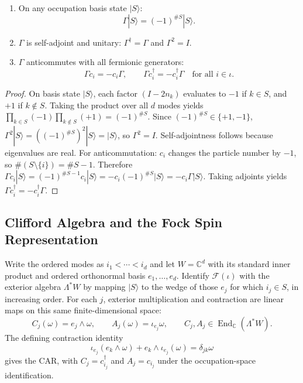 \begin{theorem}
\label{thm:parity_properties}
\begin{enumerate}
    \item On any occupation basis state $|S\rangle$:
    \begin{equation}
    \Gamma |S\rangle = (-1)^{\#S} |S\rangle.
    \end{equation}
    \item $\Gamma$ is self-adjoint and unitary: $\Gamma^\dagger = \Gamma$ and $\Gamma^2 = I$.
    \item $\Gamma$ anticommutes with all fermionic generators:
    \begin{equation}
    \Gamma c_i = - c_i \Gamma, \qquad \Gamma c_i^\dagger = - c_i^\dagger \Gamma \quad \text{for all } i \in \iota.
    \end{equation}
\end{enumerate}
\end{theorem}

\begin{proof}
On basis state $|S\rangle$, each factor $(I - 2 n_k)$ evaluates to $-1$ if $k \in S$, and $+1$ if $k \notin S$. Taking the product over all $d$ modes yields $\prod_{k \in S} (-1) \prod_{k \notin S} (+1) = (-1)^{\#S}$.
Since $(-1)^{\#S} \in \{+1, -1\}$, $\Gamma^2 |S\rangle = ((-1)^{\#S})^2 |S\rangle = |S\rangle$, so $\Gamma^2 = I$. Self-adjointness follows because eigenvalues are real.
For anticommutation: $c_i$ changes the particle number by $-1$, so $\#(S \setminus \{i\}) = \#S - 1$.
Therefore $\Gamma c_i |S\rangle = (-1)^{\#S - 1} c_i |S\rangle = - c_i (-1)^{\#S} |S\rangle = - c_i \Gamma |S\rangle$.
Taking adjoints yields $\Gamma c_i^\dagger = - c_i^\dagger \Gamma$.
\end{proof}

\subsection{Clifford Algebra and the Fock Spin Representation}

Write the ordered modes as $i_1<\cdots<i_d$ and let $W=\mathbb C^d$ with its standard inner product and ordered orthonormal basis $e_1,\ldots,e_d$. Identify $\mathcal F(\iota)$ with the exterior algebra $\Lambda^*W$ by mapping $|S\rangle$ to the wedge of those $e_j$ for which $i_j\in S$, in increasing order. For each $j$, exterior multiplication and contraction are linear maps on this same finite-dimensional space:
\begin{equation}
C_j(\omega)=e_j\wedge\omega,\qquad A_j(\omega)=\iota_{e_j}\omega,
\qquad C_j,A_j\in\operatorname{End}_{\mathbb C}(\Lambda^*W).
\end{equation}
The defining contraction identity
\begin{equation}
\iota_{e_j}(e_k\wedge\omega)+e_k\wedge\iota_{e_j}(\omega)=\delta_{jk}\omega
\end{equation}
gives the CAR, with $C_j=c_{i_j}^\dagger$ and $A_j=c_{i_j}$ under the occupation-space identification.

